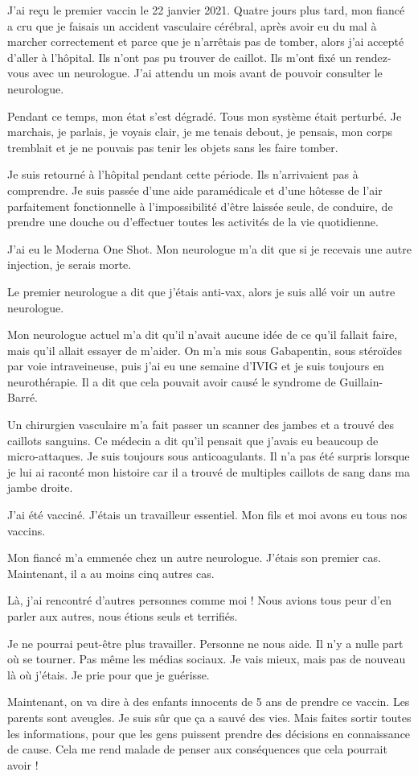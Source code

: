 J'ai reçu le premier vaccin le 22 janvier 2021. Quatre jours plus tard, mon
fiancé a cru que je faisais un accident vasculaire cérébral, après avoir eu du
mal à marcher correctement et parce que je n'arrêtais pas de tomber, alors j'ai
accepté d'aller à l'hôpital. Ils n'ont pas pu trouver de caillot. Ils m'ont fixé
un rendez-vous avec un neurologue. J'ai attendu un mois avant de pouvoir
consulter le neurologue.

Pendant ce temps, mon état s'est dégradé. Tous mon système était perturbé. Je
marchais, je parlais, je voyais clair, je me tenais debout, je pensais, mon
corps tremblait et je ne pouvais pas tenir les objets sans les faire tomber.

Je suis retourné à l'hôpital pendant cette période. Ils n'arrivaient pas à
comprendre. Je suis passée d'une aide paramédicale et d'une hôtesse de l'air
parfaitement fonctionnelle à l'impossibilité d'être laissée seule, de conduire,
de prendre une douche ou d'effectuer toutes les activités de la vie quotidienne.

J'ai eu le Moderna One Shot. Mon neurologue m'a dit que si je recevais une autre
injection, je serais morte.

Le premier neurologue a dit que j'étais anti-vax, alors je suis allé voir un
autre neurologue.

Mon neurologue actuel m'a dit qu'il n'avait aucune idée de ce qu'il fallait
faire, mais qu'il allait essayer de m'aider. On m'a mis sous Gabapentin, sous
stéroïdes par voie intraveineuse, puis j'ai eu une semaine d'IVIG et je suis
toujours en neurothérapie. Il a dit que cela pouvait avoir causé le syndrome de
Guillain-Barré.

Un chirurgien vasculaire m'a fait passer un scanner des jambes et a trouvé des
caillots sanguins. Ce médecin a dit qu'il pensait que j'avais eu beaucoup de
micro-attaques. Je suis toujours sous anticoagulants. Il n'a pas été surpris
lorsque je lui ai raconté mon histoire car il a trouvé de multiples caillots de
sang dans ma jambe droite.

J'ai été vacciné. J'étais un travailleur essentiel. Mon fils et moi avons eu
tous nos vaccins.

Mon fiancé m'a emmenée chez un autre neurologue. J'étais son premier
cas. Maintenant, il a au moins cinq autres cas.

Là, j'ai rencontré d'autres personnes comme moi ! Nous avions tous peur d'en
parler aux autres, nous étions seuls et terrifiés.

Je ne pourrai peut-être plus travailler. Personne ne nous aide. Il n'y a nulle
part où se tourner. Pas même les médias sociaux. Je vais mieux, mais pas de
nouveau là où j'étais. Je prie pour que je guérisse.

Maintenant, on va dire à des enfants innocents de 5 ans de prendre ce
vaccin. Les parents sont aveugles. Je suis sûr que ça a sauvé des vies. Mais
faites sortir toutes les informations, pour que les gens puissent prendre des
décisions en connaissance de cause. Cela me rend malade de penser aux
conséquences que cela pourrait avoir !
